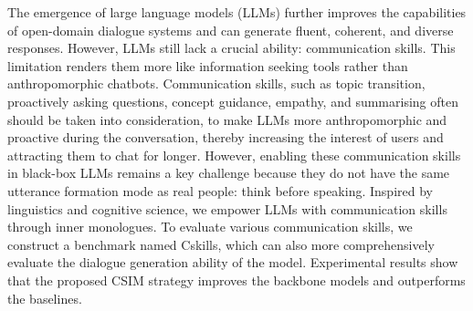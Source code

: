 The emergence of large language models (LLMs) further improves the capabilities of open-domain dialogue systems and can generate fluent, coherent, and diverse responses. However, LLMs still lack a crucial ability: communication skills. This limitation renders them more like information seeking tools rather than anthropomorphic chatbots. Communication skills, such as topic transition, proactively asking questions, concept guidance, empathy, and summarising often should be taken into consideration, to make LLMs more anthropomorphic and proactive during the conversation, thereby increasing the interest of users and attracting them to chat for longer. However, enabling these communication skills in black-box LLMs remains a key challenge because they do not have the same utterance formation mode as real people: think before speaking. Inspired by linguistics and cognitive science, we empower LLMs with communication skills through inner monologues. To evaluate various communication skills, we construct a benchmark named Cskills, which can also more comprehensively evaluate the dialogue generation ability of the model. Experimental results show that the proposed CSIM strategy improves the backbone models and outperforms the baselines.